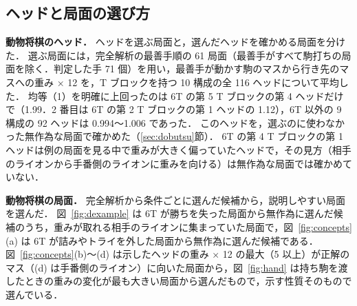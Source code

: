 \documentclass[submit]{ipsj}
\begin{document}
\subsection{ヘッドと局面の選び方}
\label{sec:select}
\textbf{動物将棋のヘッド．}
ヘッドを選ぶ局面と，選んだヘッドを確かめる局面を分けた．
選ぶ局面には，完全解析の最善手順の 61 局面（最善手がすべて駒打ちの局面を除く．判定した手 71 個）を用い，最善手が動かす駒のマスから行き先のマスへの重み × 12 を，T ブロックを持つ 10 構成の全 116 ヘッドについて平均した．
均等（1）を明確に上回ったのは 6T の第 5 T ブロックの第 4 ヘッドだけで（1.99．2 番目は 6T の第 2 T ブロックの第 1 ヘッドの 1.12），6T 以外の 9 構成の 92 ヘッドは 0.994〜1.006 であった．
このヘッドを，選ぶのに使わなかった無作為な局面で確かめた（\ref{sec:dobutsu}節）．
6T の第 4 T ブロックの第 1 ヘッドは例の局面を見る中で重みが大きく偏っていたヘッドで，その見方（相手のライオンから手番側のライオンに重みを向ける）は無作為な局面では確かめていない．

\textbf{動物将棋の局面．}
完全解析から条件ごとに選んだ候補から，説明しやすい局面を選んだ．
図~\ref{fig:dexample} は 6T が勝ちを失った局面から無作為に選んだ候補のうち，重みが取れる相手のライオンに集まっていた局面で，図~\ref{fig:concepts}(a) は 6T が詰みやトライを外した局面から無作為に選んだ候補である．
図~\ref{fig:concepts}(b)〜(d) は示したヘッドの重み × 12 の最大（5 以上）が正解のマス（(d) は手番側のライオン）に向いた局面から，図~\ref{fig:hand} は持ち駒を渡したときの重みの変化が最も大きい局面から選んだもので，示す性質そのもので選んでいる．
\end{document}

